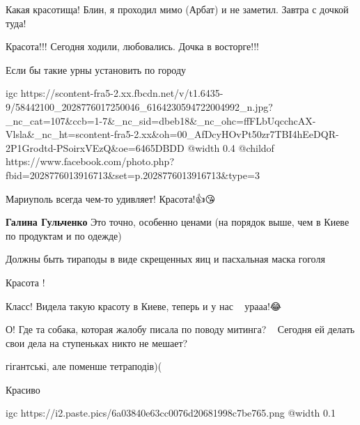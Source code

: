  
 
 
 
 

\qqSecCmt


Какая красотища! Блин, я проходил мимо (Арбат) и не заметил. Завтра с дочкой туда!


Красота!!! Сегодня ходили, любовались. Дочка в восторге!!!


Если бы такие урны установить по городу

\ifcmt
  igc https://scontent-fra5-2.xx.fbcdn.net/v/t1.6435-9/58442100_2028776017250046_6164230594722004992_n.jpg?_nc_cat=107&ccb=1-7&_nc_sid=dbeb18&_nc_ohc=ffFLbUqcchcAX-Vlsla&_nc_ht=scontent-fra5-2.xx&oh=00_AfDcyHOvPt50zr7TBI4hEeDQR-2P1Grodtd-PSoirxVEzQ&oe=6465DBDD
	@width 0.4
	@childof https://www.facebook.com/photo.php?fbid=2028776013916713&set=p.2028776013916713&type=3
\fi


Мариуполь всегда чем-то удивляет! Красота!👍😘

\begin{itemize} %
\textbf{Галина Гульченко} Это точно, особенно ценами (на порядок выше, чем в Киеве по продуктам и по одежде)🤣🤣🤣
\end{itemize} %


Должны быть тираподы в виде скрещенных яиц и пасхальная маска гоголя


Красота !


Класс! Видела такую красоту в Киеве, теперь и у нас 👏😜😍урааа!😂


О! Где та собака, которая жалобу писала по поводу митинга?🤣🤣🤣 Сегодня ей
делать свои дела на ступеньках никто не мешает?🤣🤣🤣


гігантські, але поменше тетраподів)(


Красиво


\ifcmt
  igc https://i2.paste.pics/6a03840e63cc0076d20681998c7be765.png
	@width 0.1
\fi
